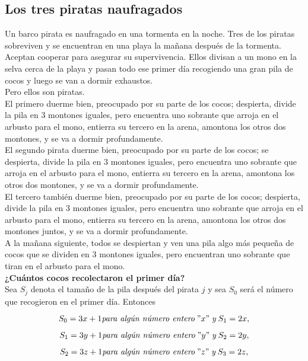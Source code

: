 \documentclass{article}
\begin{document}
\subsection{Los tres piratas naufragados}

Un barco pirata es naufragado en una tormenta en la noche. Tres de los piratas sobreviven y se encuentran en una playa la mañana después de la tormenta. Aceptan cooperar para asegurar su supervivencia. Ellos divisan a un mono en la selva cerca de la playa y pasan todo ese primer día recogiendo una gran pila de cocos y luego se van a dormir exhaustos.\\
Pero ellos son piratas.\\
El primero duerme bien, preocupado por su parte de los cocos; despierta, divide la pila en 3 montones iguales, pero encuentra uno sobrante que arroja en el arbusto para el mono, entierra su tercero en la arena, amontona los otros dos montones, y se va a dormir profundamente.\\
El segundo pirata duerme bien, preocupado por su parte de los cocos; se despierta, divide la pila en 3 montones iguales, pero encuentra uno sobrante que arroja en el arbusto para el mono, entierra su tercero en la arena, amontona los otros dos montones, y se va a dormir profundamente.\\

El tercero también duerme bien, preocupado por su parte de los cocos; despierta, divide la pila en 3 montones iguales, pero encuentra uno sobrante que arroja en el arbusto para el mono, entierra su tercero en la arena, amontona los otros dos montones juntos, y se va a dormir profundamente.\\

A la mañana siguiente, todos se despiertan y ven una pila algo más pequeña de cocos que se dividen en 3 montones iguales, pero encuentran uno sobrante que tiran en el arbusto para el mono.\\

{\bf ¿Cuántos cocos recolectaron el primer día?}\\

Sea $S_{j}$ denota el tamaño de la pila después del pirata $j$ y sea $S_{0}$ será el número que recogieron en el primer día. Entonces

$$
S_{0} = 3x+1 \textit{para algún número entero}\; "x" \; \textit{y} \; S_1 = 2x,
$$

$$
S_{1} = 3y+1 \textit{para algún número entero}\; "y" \; \textit{y} \; S_2 = 2y,
$$

$$
S_{2} = 3z+1 \textit{para algún número entero}\; "z" \; \textit{y} \; S_3 = 2z,
$$
\end{document}
